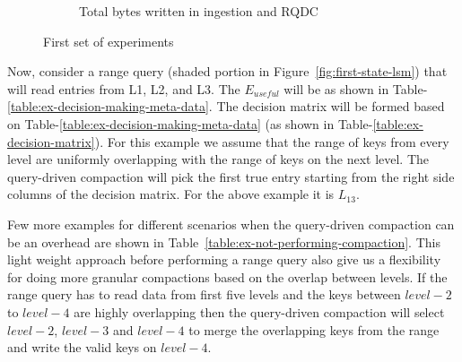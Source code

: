 \begin{figure}
\begin{subfigure}{0.33\textwidth}
        \caption{Total bytes written in ingestion and RQDC}\label{fig:range_query_flush_write_bytes}
    \end{subfigure}
    \caption{First set of experiments}
\end{figure}

Now, consider a range query (shaded portion in Figure~\ref{fig:first-state-lsm}) that will read entries from L1, L2, and L3.
The $E_{useful}$ will be as shown in Table-\ref{table:ex-decision-making-meta-data}.
The decision matrix will be formed based on Table-\ref{table:ex-decision-making-meta-data} (as shown in 
Table-\ref{table:ex-decision-matrix}). For this example we assume that the range of keys from every level are uniformly
overlapping with the range of keys on the next level. The query-driven compaction will pick the first true entry starting
from the right side columns of the decision matrix. For the above example it is $L_{13}$.




Few more examples for different scenarios when the query-driven compaction can be an overhead are shown in 
Table~\ref{table:ex-not-performing-compaction}. This light weight approach before performing a range query also give us a 
flexibility for doing more granular compactions based on the overlap between levels. If the range query has to read data
from first five levels and the keys between $level-2$ to $level-4$ are highly overlapping then the query-driven compaction
will select $level-2$, $level-3$ and $level-4$ to merge the overlapping keys from the range and write the valid keys on $level-4$.







